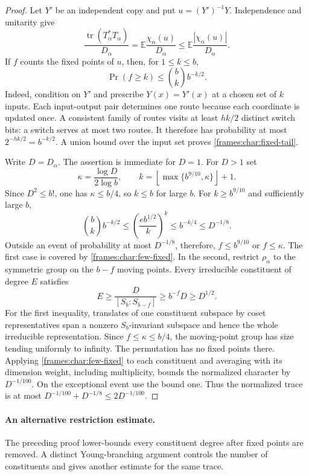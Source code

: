 \begin{proof}
Let $Y'$ be an independent copy and put $u=(Y')^{-1}Y$. Independence
and unitarity give
\[
 \frac{\operatorname{tr}(T_\alpha^*T_\alpha)}{D_\alpha}
 =\mathbb E\frac{\chi_\alpha(u)}{D_\alpha}
 \le\mathbb E\frac{|\chi_\alpha(u)|}{D_\alpha}.
\]
If $f$ counts the fixed points of $u$, then, for $1\le k\le b$,
\begin{equation}\label{frames:char:fixed-tail}
 \Pr(f\ge k)\le\binom bk b^{-k/2}.
\end{equation}
Indeed, condition on $Y'$ and prescribe $Y(x)=Y'(x)$ at a chosen set
of $k$ inputs. Each input-output pair determines one route because each
coordinate is updated once. A consistent family of routes visits at
least $hk/2$ distinct switch bits: a switch serves at most two routes.
It therefore has probability at most $2^{-hk/2}=b^{-k/2}$. A union
bound over the input set proves \eqref{frames:char:fixed-tail}.

Write $D=D_\alpha$. The assertion is immediate for $D=1$. For $D>1$ set
\[
 \kappa=\frac{\log D}{2\log b},\qquad
 k=\left\lfloor\max\{b^{9/10},\kappa\}\right\rfloor+1.
\]
Since $D^2\le b!$, one has $\kappa\le b/4$, so $k\le b$ for large $b$.
For $k\ge b^{9/10}$ and sufficiently large $b$,
\[
 \binom bk b^{-k/2}
 \le\left(\frac{e b^{1/2}}k\right)^k
 \le b^{-k/4}\le D^{-1/8}.
\]
Outside an event of probability at most $D^{-1/8}$, therefore,
$f\le b^{9/10}$ or $f\le\kappa$. The first case is covered by
\eqref{frames:char:few-fixed}. In the second, restrict $\rho_\alpha$
to the symmetric group on the $b-f$ moving points. Every irreducible
constituent of degree $E$ satisfies
\[
 E\ge\frac{D}{[S_b:S_{b-f}]}\ge b^{-f}D\ge D^{1/2}.
\]
For the first inequality, translates of one constituent subspace by
coset representatives span a nonzero $S_b$-invariant subspace and hence
the whole irreducible representation. Since $f\le\kappa\le b/4$,
the moving-point group has size tending uniformly to infinity.
The permutation has no fixed points there. Applying
\eqref{frames:char:few-fixed} to each constituent and averaging with
its dimension weight, including multiplicity, bounds the normalized
character by $D^{-1/100}$. On the exceptional event use the bound one.
Thus the normalized trace is at most
$D^{-1/100}+D^{-1/8}\le2D^{-1/100}$.
\end{proof}

\paragraph{An alternative restriction estimate.}
The preceding proof lower-bounds every constituent degree after fixed
points are removed. A distinct Young-branching argument controls the
number of constituents and gives another estimate for the same trace.

